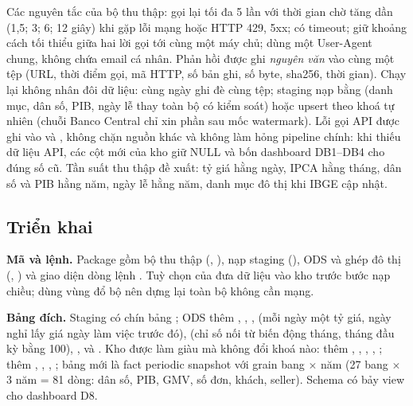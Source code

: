 Các nguyên tắc của bộ thu thập: gọi lại tối đa 5 lần với thời gian chờ tăng dần (1,5; 3; 6; 12 giây) khi gặp lỗi mạng hoặc HTTP 429, 5xx; có timeout; giữ khoảng cách tối thiểu giữa hai lời gọi tới cùng một máy chủ; dùng một User-Agent chung, không chứa email cá nhân. Phản hồi được ghi \emph{nguyên văn} vào  cùng một tệp  (URL, thời điểm gọi, mã HTTP, số bản ghi, số byte, sha256, thời gian). Chạy lại không nhân đôi dữ liệu: cùng ngày ghi đè cùng tệp; staging nạp bằng  (danh mục, dân số, PIB, ngày lễ thay toàn bộ có kiểm soát) hoặc upsert theo khoá tự nhiên (chuỗi Banco Central chỉ xin phần sau mốc watermark). Lỗi gọi API được ghi vào  và , không chặn nguồn khác và không làm hỏng pipeline chính: khi thiếu dữ liệu API, các cột mới của kho giữ NULL và bốn dashboard DB1--DB4 cho đúng số cũ. Tần suất thu thập đề xuất: tỷ giá hằng ngày, IPCA hằng tháng, dân số và PIB hằng năm, ngày lễ hằng năm, danh mục đô thị khi IBGE cập nhật.

\subsection{Triển khai}\label{sec:api-trien-khai}
\textbf{Mã và lệnh.} Package  gồm bộ thu thập (, ), nạp staging (), ODS và ghép đô thị (, ) và giao diện dòng lệnh . Tuỳ chọn  của  đưa dữ liệu vào kho trước bước nạp chiều;  dùng vùng đổ bộ nên dựng lại toàn bộ không cần mạng.

\textbf{Bảng đích.} Staging có chín bảng ; ODS thêm , , ,  (mỗi ngày một tỷ giá, ngày nghỉ lấy giá ngày làm việc trước đó),  (chỉ số nối từ biến động tháng, tháng đầu kỳ bằng 100), ,  và . Kho được làm giàu mà không đổi khoá nào:  thêm , , , , ;  thêm , , , ; bảng mới  là fact periodic snapshot với grain bang $\times$ năm (27 bang $\times$ 3 năm = 81 dòng: dân số, PIB, GMV, số đơn, khách, seller). Schema  có bảy view cho dashboard D8.

